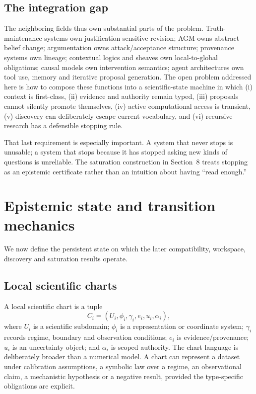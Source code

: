 \documentclass[11pt]{article}
\begin{document}
\subsection{The integration gap}

The neighboring fields thus own substantial parts of the problem. Truth-maintenance systems own justification-sensitive revision; AGM owns abstract belief change; argumentation owns attack/acceptance structure; provenance systems own lineage; contextual logics and sheaves own local-to-global obligations; causal models own intervention semantics; agent architectures own tool use, memory and iterative proposal generation. The open problem addressed here is how to compose these functions into a scientific-state machine in which (i) context is first-class, (ii) evidence and authority remain typed, (iii) proposals cannot silently promote themselves, (iv) active computational access is transient, (v) discovery can deliberately escape current vocabulary, and (vi) recursive research has a defensible stopping rule.

That last requirement is especially important. A system that never stops is unusable; a system that stops because it has stopped asking new kinds of questions is unreliable. The saturation construction in Section~8 treats stopping as an epistemic certificate rather than an intuition about having ``read enough.''

\section{Epistemic state and transition mechanics}

We now define the persistent state on which the later compatibility, workspace, discovery and saturation results operate.

\subsection{Local scientific charts}

A local scientific chart is a tuple
\[
C_i=(U_i,\phi_i,\gamma_i,e_i,u_i,\alpha_i),
\]
where \(U_i\) is a scientific subdomain; \(\phi_i\) is a representation or coordinate system; \(\gamma_i\) records regime, boundary and observation conditions; \(e_i\) is evidence/provenance; \(u_i\) is an uncertainty object; and \(\alpha_i\) is scoped authority. The chart language is deliberately broader than a numerical model. A chart can represent a dataset under calibration assumptions, a symbolic law over a regime, an observational claim, a mechanistic hypothesis or a negative result, provided the type-specific obligations are explicit.
\end{document}
